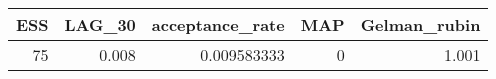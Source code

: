 \begin{longtable}{rrrrr}
\toprule
ESS & LAG\_30 & acceptance\_rate & MAP & Gelman\_rubin \\ 
\midrule
75 & 0.008 & 0.009583333 & 0 & 1.001 \\ 
\bottomrule
\end{longtable}


